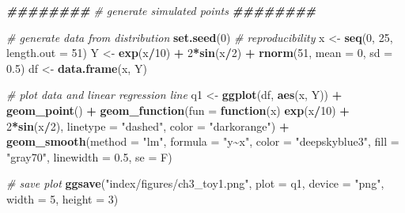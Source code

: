 \documentclass[12pt, twoside]{amherstthesis}
\newenvironment{Shaded}{\begin{snugshade}}{\end{snugshade}}
\newcommand{\AttributeTok}[1]{\textcolor[rgb]{0.13,0.29,0.53}{#1}}
\newcommand{\CommentTok}[1]{\textcolor[rgb]{0.56,0.35,0.01}{\textit{#1}}}
\newcommand{\ControlFlowTok}[1]{\textcolor[rgb]{0.13,0.29,0.53}{\textbf{#1}}}
\newcommand{\DecValTok}[1]{\textcolor[rgb]{0.00,0.00,0.81}{#1}}
\newcommand{\DocumentationTok}[1]{\textcolor[rgb]{0.56,0.35,0.01}{\textbf{\textit{#1}}}}
\newcommand{\FloatTok}[1]{\textcolor[rgb]{0.00,0.00,0.81}{#1}}
\newcommand{\FunctionTok}[1]{\textcolor[rgb]{0.13,0.29,0.53}{\textbf{#1}}}
\newcommand{\NormalTok}[1]{#1}
\newcommand{\OtherTok}[1]{\textcolor[rgb]{0.56,0.35,0.01}{#1}}
\newcommand{\SpecialCharTok}[1]{\textcolor[rgb]{0.81,0.36,0.00}{\textbf{#1}}}
\newcommand{\StringTok}[1]{\textcolor[rgb]{0.31,0.60,0.02}{#1}}
\begin{document}
\scriptsize
\begin{Shaded}
\begin{Highlighting}[]
\DocumentationTok{\#\#\#\#\#\#\#\#}
\CommentTok{\# generate simulated points}
\DocumentationTok{\#\#\#\#\#\#\#\#}

\CommentTok{\# generate data from distribution}
\FunctionTok{set.seed}\NormalTok{(}\DecValTok{0}\NormalTok{) }\CommentTok{\# reproducibility}
\NormalTok{x }\OtherTok{\textless{}{-}} \FunctionTok{seq}\NormalTok{(}\DecValTok{0}\NormalTok{, }\DecValTok{25}\NormalTok{, }\AttributeTok{length.out =} \DecValTok{51}\NormalTok{)}
\NormalTok{Y }\OtherTok{\textless{}{-}} \FunctionTok{exp}\NormalTok{(x}\SpecialCharTok{/}\DecValTok{10}\NormalTok{) }\SpecialCharTok{+} \DecValTok{2}\SpecialCharTok{*}\FunctionTok{sin}\NormalTok{(x}\SpecialCharTok{/}\DecValTok{2}\NormalTok{) }\SpecialCharTok{+} \FunctionTok{rnorm}\NormalTok{(}\DecValTok{51}\NormalTok{, }\AttributeTok{mean =} \DecValTok{0}\NormalTok{, }\AttributeTok{sd =} \FloatTok{0.5}\NormalTok{)}
\NormalTok{df }\OtherTok{\textless{}{-}} \FunctionTok{data.frame}\NormalTok{(x, Y)}

\CommentTok{\# plot data and linear regression line}
\NormalTok{q1 }\OtherTok{\textless{}{-}} \FunctionTok{ggplot}\NormalTok{(df, }\FunctionTok{aes}\NormalTok{(x, Y)) }\SpecialCharTok{+}
  \FunctionTok{geom\_point}\NormalTok{() }\SpecialCharTok{+}
  \FunctionTok{geom\_function}\NormalTok{(}\AttributeTok{fun =} \ControlFlowTok{function}\NormalTok{(x) }\FunctionTok{exp}\NormalTok{(x}\SpecialCharTok{/}\DecValTok{10}\NormalTok{) }\SpecialCharTok{+} \DecValTok{2}\SpecialCharTok{*}\FunctionTok{sin}\NormalTok{(x}\SpecialCharTok{/}\DecValTok{2}\NormalTok{), }
                \AttributeTok{linetype =} \StringTok{"dashed"}\NormalTok{, }\AttributeTok{color =} \StringTok{"darkorange"}\NormalTok{) }\SpecialCharTok{+} 
  \FunctionTok{geom\_smooth}\NormalTok{(}\AttributeTok{method =} \StringTok{"lm"}\NormalTok{, }\AttributeTok{formula =} \StringTok{"y\textasciitilde{}x"}\NormalTok{, }
              \AttributeTok{color =} \StringTok{"deepskyblue3"}\NormalTok{, }\AttributeTok{fill =} \StringTok{"gray70"}\NormalTok{, }
              \AttributeTok{linewidth =} \FloatTok{0.5}\NormalTok{, }\AttributeTok{se =}\NormalTok{ F)}

\CommentTok{\# save plot}
\FunctionTok{ggsave}\NormalTok{(}\StringTok{"index/figures/ch3\_toy1.png"}\NormalTok{, }\AttributeTok{plot =}\NormalTok{ q1, }\AttributeTok{device =} \StringTok{"png"}\NormalTok{, }
       \AttributeTok{width =} \DecValTok{5}\NormalTok{, }\AttributeTok{height =} \DecValTok{3}\NormalTok{)}
\end{Highlighting}
\end{Shaded}
\normalsize
\end{document}
